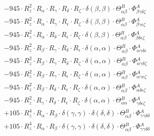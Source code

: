 \documentclass{article}
\begin{document}
\begin{subequations}
\begin{gather}
\begin{array}{c}
 \\[0.2em] 		 - 945 \cdot R_{z}^{2} \cdot R_{\alpha{}} \cdot R_{\gamma{}} \cdot R_{\delta{}} \cdot R_{\zeta{}} \cdot \delta{}\left(\beta{}, \beta{}\right) \cdot \Theta{}^{B}_{\alpha{}\beta{}} \cdot \Phi{}^{A}_{\beta{}\gamma{}\delta{}\zeta{}} 
 \\[0.2em] 		 - 945 \cdot R_{z}^{2} \cdot R_{\alpha{}} \cdot R_{\gamma{}} \cdot R_{\epsilon{}} \cdot R_{\zeta{}} \cdot \delta{}\left(\beta{}, \beta{}\right) \cdot \Theta{}^{B}_{\alpha{}\beta{}} \cdot \Phi{}^{A}_{\beta{}\gamma{}\epsilon{}\zeta{}} 
 \\[0.2em] 		 - 945 \cdot R_{z}^{2} \cdot R_{\alpha{}} \cdot R_{\delta{}} \cdot R_{\epsilon{}} \cdot R_{\zeta{}} \cdot \delta{}\left(\beta{}, \beta{}\right) \cdot \Theta{}^{B}_{\alpha{}\beta{}} \cdot \Phi{}^{A}_{\beta{}\delta{}\epsilon{}\zeta{}} 
 \\[0.2em] 		 - 945 \cdot R_{z}^{2} \cdot R_{\beta{}} \cdot R_{\gamma{}} \cdot R_{\delta{}} \cdot R_{\epsilon{}} \cdot \delta{}\left(\alpha{}, \alpha{}\right) \cdot \Theta{}^{B}_{\alpha{}\beta{}} \cdot \Phi{}^{A}_{\alpha{}\gamma{}\delta{}\epsilon{}} 
 \\[0.2em] 		 - 945 \cdot R_{z}^{2} \cdot R_{\beta{}} \cdot R_{\gamma{}} \cdot R_{\delta{}} \cdot R_{\zeta{}} \cdot \delta{}\left(\alpha{}, \alpha{}\right) \cdot \Theta{}^{B}_{\alpha{}\beta{}} \cdot \Phi{}^{A}_{\alpha{}\gamma{}\delta{}\zeta{}} 
 \\[0.2em] 		 - 945 \cdot R_{z}^{2} \cdot R_{\beta{}} \cdot R_{\gamma{}} \cdot R_{\epsilon{}} \cdot R_{\zeta{}} \cdot \delta{}\left(\alpha{}, \alpha{}\right) \cdot \Theta{}^{B}_{\alpha{}\beta{}} \cdot \Phi{}^{A}_{\alpha{}\gamma{}\epsilon{}\zeta{}} 
 \\[0.2em] 		 - 945 \cdot R_{z}^{2} \cdot R_{\beta{}} \cdot R_{\delta{}} \cdot R_{\epsilon{}} \cdot R_{\zeta{}} \cdot \delta{}\left(\alpha{}, \alpha{}\right) \cdot \Theta{}^{B}_{\alpha{}\beta{}} \cdot \Phi{}^{A}_{\alpha{}\delta{}\epsilon{}\zeta{}} 
 \\[0.2em] 		 - 945 \cdot R_{z}^{2} \cdot R_{\gamma{}} \cdot R_{\delta{}} \cdot R_{\epsilon{}} \cdot R_{\zeta{}} \cdot \delta{}\left(\alpha{}, \alpha{}\right) \cdot \Theta{}^{B}_{\alpha{}\alpha{}} \cdot \Phi{}^{A}_{\gamma{}\delta{}\epsilon{}\zeta{}} 
 \\[0.2em] 		 + 105 \cdot R_{z}^{4} \cdot R_{\alpha{}} \cdot R_{\beta{}} \cdot \delta{}\left(\gamma{}, \gamma{}\right) \cdot \delta{}\left(\delta{}, \delta{}\right) \cdot \Theta{}^{B}_{\alpha{}\beta{}} \cdot \Phi{}^{A}_{\gamma{}\gamma{}\delta{}\delta{}} 
 \\[0.2em] 		 + 105 \cdot R_{z}^{4} \cdot R_{\alpha{}} \cdot R_{\beta{}} \cdot \delta{}\left(\gamma{}, \gamma{}\right) \cdot \delta{}\left(\delta{}, \delta{}\right) \cdot \Theta{}^{B}_{\alpha{}\beta{}} \cdot \Phi{}^{A}_{\gamma{}\gamma{}\delta{}\delta{}} 

\end{array}
\end{gather}
\end{subequations}
\end{document}

